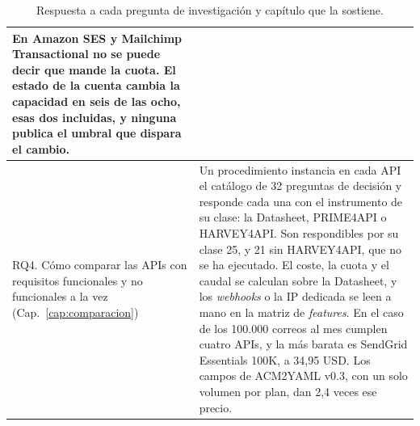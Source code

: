 \begin{table}[tbp]
\begin{tabular}{|>{\raggedright\arraybackslash}p{3.3cm}|p{10.8cm}|}
En Amazon SES y Mailchimp Transactional no se puede decir que mande la cuota.
El estado de la cuenta cambia la capacidad en seis de las ocho, esas dos incluidas, y ninguna publica el umbral que dispara el cambio. \\
\hline
RQ4. Cómo comparar las APIs con requisitos funcionales y no funcionales a la vez (Cap.~\ref{cap:comparacion}) &
Un procedimiento instancia en cada API el catálogo de 32 preguntas de decisión y responde cada una con el instrumento de su clase: la Datasheet, PRIME4API o HARVEY4API.
Son respondibles por su clase 25, y 21 sin HARVEY4API, que no se ha ejecutado.
El coste, la cuota y el caudal se calculan sobre la Datasheet, y los \textit{webhooks} o la IP dedicada se leen a mano en la matriz de \textit{features}.
En el caso de los 100.000 correos al mes cumplen cuatro APIs, y la más barata es SendGrid Essentials 100K, a 34,95 USD.
Los campos de ACM2YAML v0.3, con un solo volumen por plan, dan 2,4 veces ese precio. \\
\hline
\end{tabular}
\caption[Respuestas a las preguntas de investigación]{Respuesta a cada pregunta de investigación y capítulo que la sostiene.}
\label{tab:conclusiones:rq}
\end{table}
